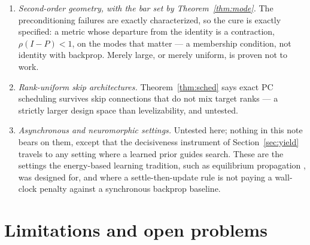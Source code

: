 \documentclass[11pt]{article}
\begin{document}
\begin{enumerate}
  leave-one-program-out stress test. Continued study is licensed as an associative
  reuse mechanism, not as a robust aggregate advantage.
\item \emph{Second-order geometry, with the bar set by Theorem~\ref{thm:mode}.} The
  preconditioning failures are exactly characterized, so the cure is exactly specified:
  a metric whose departure from the identity is a contraction, $\rho(I-P)<1$, on the modes
  that matter --- a membership condition, not identity with backprop. Merely large, or
  merely uniform, is proven not to work.
\item \emph{Rank-uniform skip architectures.} Theorem~\ref{thm:sched} says exact PC
  scheduling survives skip connections that do not mix target ranks --- a strictly larger
  design space than levelizability, and untested.
\item \emph{Asynchronous and neuromorphic settings.} Untested here; nothing in this note
  bears on them, except that the decisiveness instrument of Section~\ref{sec:yield}
  travels to any setting where a learned prior guides search. These are the settings the
  energy-based learning tradition, such as equilibrium propagation \cite{scellier2017},
  was designed for, and where a settle-then-update rule is not paying a wall-clock penalty
  against a synchronous backprop baseline.
\end{enumerate}

\section{Limitations and open problems}
\end{document}
